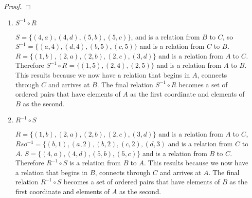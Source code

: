 
\begin{theorem}
\end{theorem}

\begin{proof}
\end{proof}

\begin{enumerate}[label=\alph*]
  \item $S^{-1} \circ R$

    $S=\{(4,a),(4,d),(5,b),(5,c)\}$, and is a relation from $B$ to $C$, so
    $S^{-1}=\{(a,4),(d,4),(b,5),(c,5)\}$ and is a relation from $C$ to $B$.
    $R=\{(1,b),(2,a),(2,b),(2,c),(3,d)\}$ and is a relation from $A$ to $C$.
    Therefore $S^{-1} \circ R = \{(1,5),(2,4),(2,5)\}$ and is a relation from
    $A$ to $B$. This results because we now have a relation that begins in $A$,
    connects through $C$ and arrives at $B$. The final relation $S^{-1} \circ R$
    becomes a set of ordered pairs that have elements of $A$ as the first
    coordinate and elements of $B$ as the second.

  \item $R^{-1} \circ S$

    $R=\{(1,b),(2,a),(2,b),(2,c),(3,d)\}$ and is a relation from $A$ to $C$,
    $Rso ^{-1}=\{(b,1),(a,2),(b,2),(c,2),(d,3)$ and is a relation from $C$ to
    $A$. $S=\{(4,a),(4,d),(5,b),(5,c)\}$ and is a relation from $B$ to $C$.
    Therefore $R^{-1} \circ S$ is a relation from $B$ to $A$. This results
    because we now have a relation that begins in $B$, connects through $C$ and
    arrives at $A$. The final relation $R^{-1} \circ S$ becomes a set of ordered
    pairs that have elements of $B$ as the first coordinate and elements of $A$
    as the second.
\end{enumerate}
